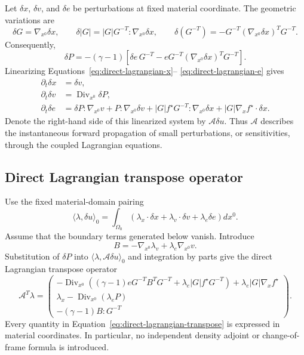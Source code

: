 \documentclass[11pt]{article}
\begin{document}
Let $\delta x$, $\delta v$, and $\delta e$ be perturbations at fixed material
coordinate.  The geometric variations are
\[
 \delta G=\nabla_{x^0}\delta x,
 \qquad
 \delta|G|=|G|G^{-T}:\nabla_{x^0}\delta x,
 \qquad
 \delta(G^{-T})=-G^{-T}(\nabla_{x^0}\delta x)^TG^{-T}.
\]
Consequently,
\[
 \delta P=-(\gamma-1)
 \left[\delta e\,G^{-T}
 -eG^{-T}(\nabla_{x^0}\delta x)^TG^{-T}\right].
\]
Linearizing Equations~\eqref{eq:direct-lagrangian-x}--
\eqref{eq:direct-lagrangian-e} gives
\begin{align}
 \partial_t\delta x&=\delta v,\\
 \partial_t\delta v&=\operatorname{Div}_{x^0}\delta P,\\
 \partial_t\delta e
 &=\delta P:\nabla_{x^0}v+P:\nabla_{x^0}\delta v
   +|G|f^\star G^{-T}:\nabla_{x^0}\delta x
   +|G|\nabla_x f^\star\mathbin{\cdot}\delta x.
\end{align}
Denote the right-hand side of this linearized system by
$\mathcal A\delta u$.
Thus $\mathcal A$ describes the instantaneous forward propagation of small
perturbations, or sensitivities, through the coupled Lagrangian equations.

\subsection{Direct Lagrangian transpose operator}

Use the fixed material-domain pairing
\[
 \langle\lambda,\delta u\rangle_0
 =\int_{\Omega_0}\left(
 \lambda_x\mathbin{\cdot}\delta x
 +\lambda_v\mathbin{\cdot}\delta v
 +\lambda_e\delta e\right)dx^0.
\]
Assume that the boundary terms generated below vanish.  Introduce
\[
 B=-\nabla_{x^0}\lambda_v+\lambda_e\nabla_{x^0}v.
\]
Substitution of $\delta P$ into
$\langle\lambda,\mathcal A\delta u\rangle_0$ and integration by parts
give the direct Lagrangian transpose operator
\begin{equation}
 \boxed{
 \mathcal A^T\lambda=
 \begin{pmatrix}
 -\operatorname{Div}_{x^0}\!\left(
 (\gamma-1)eG^{-T}B^TG^{-T}
 +\lambda_e|G|f^\star G^{-T}\right)
 +\lambda_e|G|\nabla_xf^\star\\[2mm]
 \lambda_x-\operatorname{Div}_{x^0}(\lambda_eP)\\[2mm]
 -(\gamma-1)B:G^{-T}
 \end{pmatrix}.}
 \label{eq:direct-lagrangian-transpose}
\end{equation}
Every quantity in Equation~\eqref{eq:direct-lagrangian-transpose} is expressed
in material coordinates.  In particular, no independent density adjoint or
change-of-frame formula is introduced.
\end{document}
